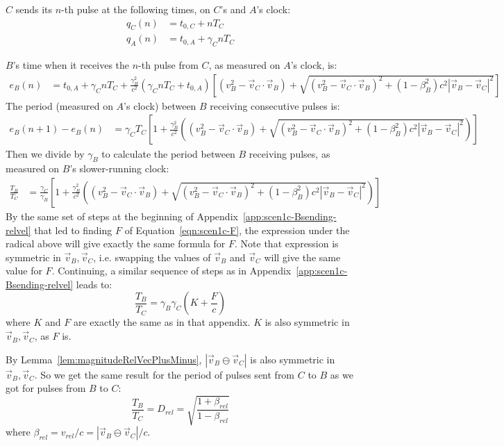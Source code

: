 \documentclass[a4paper]{article}
\theoremstyle{plain}
\theoremstyle{definition}
\newcommand{\vect}[1]{\vec{#1}}
\begin{document}
$C$ sends its $n$-th pulse at the following times, on $C$'s and $A$'s
clock:
\begin{align}
q_C(n) & = t_{0,C} + nT_C \\
q_A(n) & = t_{0,A} + \gamma_C nT_C
\end{align}

$B$'s time when it receives the $n$-th pulse from $C$, as measured on
$A$'s clock, is:
\begin{align*}
e_{B}(n)
  & = t_{0,A} + \gamma_C nT_C + \frac{\gamma_B^2}{c^2} (\gamma_C nT_C + t_{0,A}) \left[ (v_B^2 - \vect{v}_C \cdot \vect{v}_B) + \sqrt{ (v_B^2 - \vect{v}_C \cdot \vect{v}_B)^2  + (1-\beta_B^2)c^2 |\vect{v}_B - \vect{v}_C|^2 } \right]
\end{align*}
The period (measured on $A$'s clock) between $B$ receiving consecutive
pulses is:
\begin{align*}
e_{B}(n+1) - e_{B}(n)
  & = \gamma_C T_C \left[ 1 + \frac{\gamma_B^2}{c^2} \left( (v_B^2 - \vect{v}_C \cdot \vect{v}_B) + \sqrt{ (v_B^2 - \vect{v}_C \cdot \vect{v}_B)^2  + (1-\beta_B^2)c^2 |\vect{v}_B - \vect{v}_C|^2 } \right) \right]
\end{align*}
Then we divide by $\gamma_B$ to calculate the period between $B$
receiving pulses, as measured on $B$'s slower-running clock:
\begin{align*}
\frac{T_B}{T_C}
  & = \frac{\gamma_C}{\gamma_B} \left[ 1 + \frac{\gamma_B^2}{c^2} \left( (v_B^2 - \vect{v}_C \cdot \vect{v}_B) + \sqrt{ (v_B^2 - \vect{v}_C \cdot \vect{v}_B)^2  + (1-\beta_B^2)c^2 |\vect{v}_B - \vect{v}_C|^2 } \right) \right]
\end{align*}
By the same set of steps at the beginning of
Appendix~\ref{app:scen1c-Bsending-relvel} that led to finding $F$ of
Equation~\eqref{eqn:scen1c-F}, the expression under the radical above
will give exactly the same formula for $F$.  Note that expression is
symmetric in $\vect{v}_B, \vect{v}_C$, i.e. swapping the values of
$\vect{v}_B$ and $\vect{v}_C$ will give the same value for $F$.
Continuing, a similar sequence of steps as in
Appendix~\ref{app:scen1c-Bsending-relvel} leads to:
\begin{equation}
\frac{T_B}{T_C}
  = \gamma_B \gamma_C \left( K + \frac{F}{c} \right) \label{eqn:scen1c-TC5}
\end{equation}
where $K$ and $F$ are exactly the same as in that appendix.
$K$ is also symmetric in $\vect{v}_B, \vect{v}_C$, as $F$ is.

By Lemma~\ref{lem:magnitudeRelVecPlusMinus},
$|\vect{v}_B \ominus \vect{v}_C|$ is also symmetric in
$\vect{v}_B, \vect{v}_C$.
So we get the same result for the period of pulses sent from $C$ to
$B$ as we got for pulses from $B$ to $C$:
\begin{equation}
\frac{T_B}{T_C}
  = D_{rel}
  = \sqrt{ \frac{1+\beta_{rel}}{1-\beta_{rel}} }
\end{equation}
where $\beta_{rel} = v_{rel}/c = |\vect{v}_B \ominus \vect{v}_C|/c$.
\end{document}

